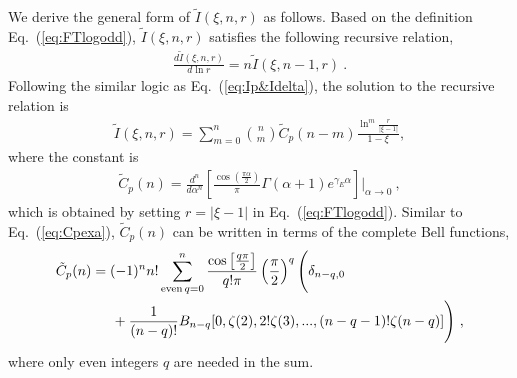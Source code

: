 \documentclass[a4paper,11pt]{article}
\begin{document}
We derive the general form of $\tilde I(\xi, n,r)$ as follows. Based on the definition Eq.~(\ref{eq:FTlogodd}), $\tilde I(\xi, n,r)$ satisfies the following recursive relation,
\begin{align}
    \frac{d \tilde I(\xi, n,r)}{d \ln r} = n \tilde I(\xi, n-1,r) \ .
\end{align}
Following the similar logic as Eq.~(\ref{eq:Ip&Idelta}), the solution to the recursive relation is
\begin{align}\label{eq:tIp}
\tilde I(\xi, n,r) = \sum_{m=0}^{n} \binom{n}{m} \tilde C_{p}(n-m) \frac{ \ln^m \frac{r}{|\xi-1|} }{1-\xi},
\end{align}
where the constant is
\begin{align}
\tilde C_{p}(n) = \frac{d^n}{d\alpha^n} \left[ \frac{\cos\left(\frac{\pi \alpha}{2}\right)}{\pi} \Gamma (\alpha +1) e^{\gamma_E  \alpha } \right] \Bigg|_{\alpha \rightarrow 0} \ ,  
\end{align}
which is obtained by setting $r=|\xi-1|$ in Eq.~(\ref{eq:FTlogodd}). 
Similar to Eq.~(\ref{eq:Cpexa}), $\tilde C_{p}(n)$ can be written in terms of the complete Bell functions,
\begin{align}\label{eq:tCpexa}
&\tilde C_p(n) = (-1)^{n} n! \sum_{{\rm even} \, q=0}^{n} \frac{\cos\left[\frac{q \pi}{2}\right]}{q! \pi}\left(\frac{\pi}{2}\right)^q 
\Bigg( \delta_{n-q,0} \Bigg. \nonumber\\
&\Bigg. \quad \quad \quad \quad +\frac{1}{(n-q)!}B_{n-q}[0,\zeta(2),2!\zeta(3),...,(n-q-1)!\zeta(n-q)] \Bigg) \ ,
\end{align}
where only even integers $q$ are needed in the sum. 

\iffalse
\end{document}
